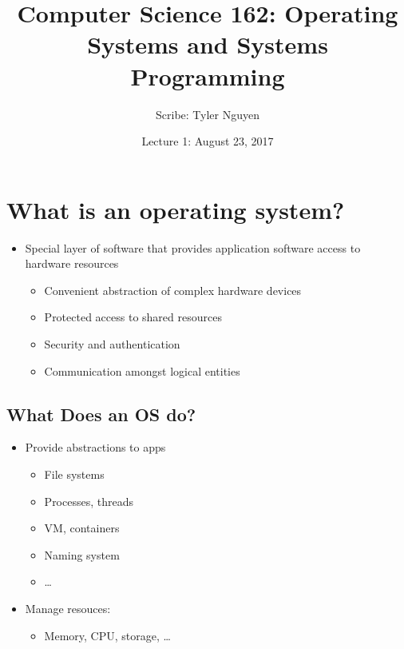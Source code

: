 \documentclass{article}
\begin{document}
\title{Computer Science 162: Operating Systems and Systems Programming}
\author{Scribe: Tyler Nguyen}
\date{Lecture 1: August 23, 2017}
\maketitle
\section{What is an operating system?}
\begin{itemize}
\item Special layer of software that provides application software access to hardware resources
\begin{itemize}
\item Convenient abstraction of complex hardware devices
\item Protected access to shared resources
\item Security and authentication
\item Communication amongst logical entities
\end{itemize}
\end{itemize}
\subsection{What Does an OS do?}
\begin{itemize}
\item Provide abstractions to apps
\begin{itemize}
\item File systems
\item Processes, threads
\item VM, containers
\item Naming system
\item \dots
\end{itemize}
\item Manage resouces:
\begin{itemize}
\item Memory, CPU, storage, \dots
\end{itemize}
\end{itemize}
\end{document}
